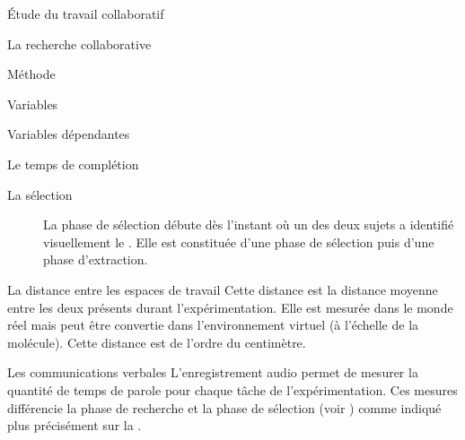 \documentclass[myfrancais]{mythesis}
\begin{document}
\begin{mypart}{Étude du travail collaboratif}
\begin{mychapter}{La recherche collaborative}
\begin{mysection}{Méthode}
\begin{mysubsection}{Variables}
\begin{mysubsubsection}{Variables dépendantes}
\begin{myparagraph}{ Le temps de complétion}
\begin{description}
								\item[La sélection] La phase de sélection débute dès l'instant où un des deux sujets a identifié visuellement le .
									Elle est constituée d'une phase de sélection puis d'une phase d'extraction.
							\end{description}
						\end{myparagraph}
						\begin{myparagraph}{ La distance entre les espaces de travail}
							Cette distance est la distance moyenne entre les deux  présents durant l'expérimentation.
							Elle est mesurée dans le monde réel mais peut être convertie dans l'environnement virtuel (à l'échelle de la molécule).
							Cette distance est de l'ordre du centimètre.
						\end{myparagraph}
						\begin{myparagraph}{ Les communications verbales}
							L'enregistrement audio permet de mesurer la quantité de temps de parole pour chaque tâche de l'expérimentation.
							Ces mesures différencie la phase de recherche et la phase de sélection (voir ) comme indiqué plus précisément sur la .


\end{myparagraph}
\end{mysubsubsection}
\end{mysubsection}
\end{mysection}
\end{mychapter}
\end{mypart}
\end{document}
